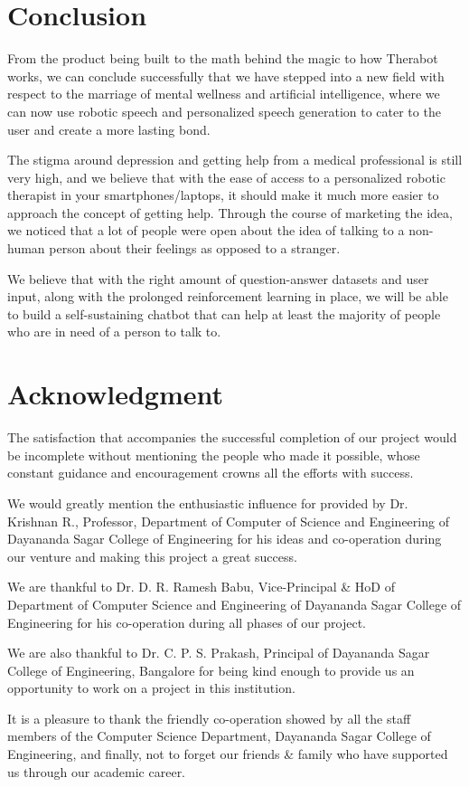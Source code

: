 \documentclass[conference,compsoc]{IEEEtran}
\begin{document}
\section{Conclusion}

From the product being built to the math behind the magic to how Therabot works, we can conclude successfully that we have stepped into a new field with respect to the marriage of mental wellness and artificial intelligence, where we can now use robotic speech and personalized speech generation to cater to the user and create a more lasting bond.

The stigma around depression and getting help from a medical professional is still very high, and we believe that with the ease of access to a personalized robotic therapist in your smartphones/laptops, it should make it much more easier to approach the concept of getting help. Through the course of marketing the idea, we noticed that a lot of people were open about the idea of talking to a non-human person about their feelings as opposed to a stranger.

We believe that with the right amount of question-answer datasets and user input, along with the prolonged reinforcement learning in place, we will be able to build a self-sustaining chatbot that can help at least the majority of people who are in need of a person to talk to.


\section{Acknowledgment}

The satisfaction that accompanies the successful completion of our project would be incomplete without mentioning the people who made it possible, whose constant guidance and encouragement crowns all the efforts with success.

We would greatly mention the enthusiastic influence for provided by Dr. Krishnan R., Professor, Department of Computer of Science and Engineering of Dayananda Sagar College of Engineering for his ideas and co-operation during our venture and making this project a great success.

We are thankful to Dr. D. R. Ramesh Babu, Vice-Principal \& HoD of Department of Computer Science and Engineering of Dayananda Sagar College of Engineering for his co-operation during all phases of our project.

We are also thankful to Dr. C. P. S. Prakash, Principal of Dayananda Sagar College of Engineering, Bangalore for being kind enough to provide us an opportunity to work on a project in this institution.

It is a pleasure to thank the friendly co-operation showed by all the staff members of the Computer Science Department, Dayananda Sagar College of Engineering, and finally, not to forget our friends \& family who have supported us through our academic career.

\printbibliography
\end{document}
